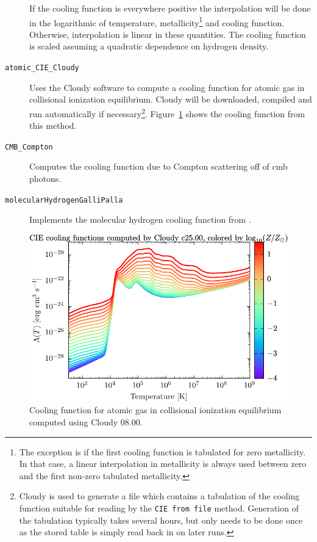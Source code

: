 \begin{description}
\begin{description}
 \end{description}
 If the cooling function is everywhere positive the interpolation will be done in the logarithmic of temperature, metallicity\footnote{The exception is if the first cooling function is tabulated for zero metallicity. In that case, a linear interpolation in metallicity is always used between zero and the first non-zero tabulated metallicity.} and cooling function. Otherwise, interpolation is linear in these quantities. The cooling function is scaled assuming a quadratic dependence on hydrogen density.
 \item [{\tt atomic\_CIE\_Cloudy}] Uses the {\sc Cloudy} software to compute a cooling function for atomic gas in collisional ionization equilibrium. {\sc Cloudy} will be downloaded, compiled and run automatically if necessary\footnote{{\sc Cloudy} is used to generate a file which contains a tabulation of the cooling function suitable for reading by the {\tt CIE from file} method. Generation of the tabulation typically takes several hours, but only needs to be done once as the stored table is simply read back in on later runs.}. Figure~\ref{fig:atomicCIECloudyCoolingFunction} shows the cooling function from this method.
 \item [{\tt CMB\_Compton}] Computes the cooling function due to Compton scattering off of \gls{cmb} photons.
 \item [{\tt molecularHydrogenGalliPalla}] Implements the molecular hydrogen cooling function from \cite{galli_chemistry_1998}.
\end{description}

\begin{figure}
 \begin{center}
 \includegraphics[width=160mm]{../plots/cooling_function_Atomic_CIE_Cloudy.pdf}
 \end{center}
 \caption{Cooling function for atomic gas in collisional ionization equilibrium computed using Cloudy 08.00.}
 \label{fig:atomicCIECloudyCoolingFunction}
\end{figure}

